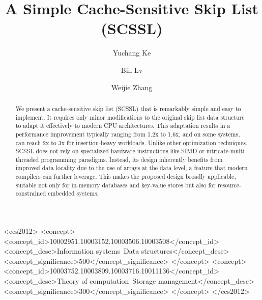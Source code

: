 \documentclass[sigconf]{acmart}
\begin{document}
\title{A Simple Cache-Sensitive Skip List (SCSSL)}

\author{Yuchang Ke}

\author{Bill Lv}

\author{Weijie Zhang}



\begin{abstract}
We present a cache-sensitive skip list (SCSSL) that is remarkably simple and easy to implement. It requires only minor modifications to the original skip list data structure to adapt it effectively to modern CPU architectures. This adaptation results in a performance improvement typically ranging from 1.2x to 1.6x, and on some systems, can reach 2x to 3x for insertion-heavy workloads.
Unlike other optimization techniques, SCSSL does not rely on specialized hardware instructions like SIMD or intricate multi-threaded programming paradigms. Instead, its design inherently benefits from improved data locality due to the use of arrays at the data level, a feature that modern compilers can further leverage. This makes the proposed design broadly applicable, suitable not only for in-memory databases and key-value stores but also for resource-constrained embedded systems.
\end{abstract}

\begin{CCSXML}
<ccs2012>
   <concept>
       <concept_id>10002951.10003152.10003506.10003508</concept_id>
       <concept_desc>Information systems~Data structures</concept_desc>
       <concept_significance>500</concept_significance>
       </concept>
   <concept>
       <concept_id>10003752.10003809.10003716.10011136</concept_id>
       <concept_desc>Theory of computation~Storage management</concept_desc>
       <concept_significance>300</concept_significance>
       </concept>
 </ccs2012>
\end{CCSXML}
\end{document}
